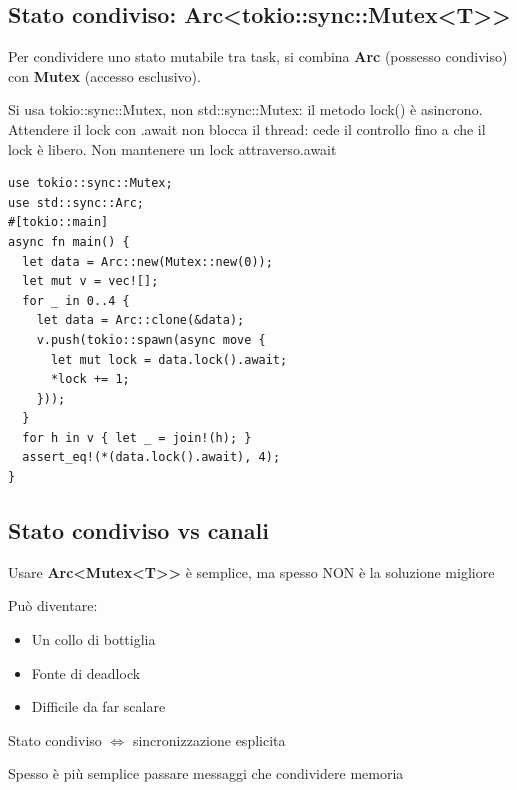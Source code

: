 \subsection{Stato condiviso: Arc<tokio::sync::Mutex<T>>}

\begin{flushleft}
  \begin{minipage}[t]{0.35\linewidth}
    \raggedright

    Per condividere uno stato mutabile tra
    task, si combina \textbf{Arc} (possesso
    condiviso) con \textbf{Mutex} (accesso
    esclusivo).

    Si usa tokio::sync::Mutex, non std::sync::Mutex: il metodo lock() è asincrono.
    Attendere il lock con .await non blocca il thread: cede il controllo fino a che il lock è libero.
    Non mantenere un lock attraverso.await

  \end{minipage}%
  \hfill
  \begin{minipage}[t]{0.6\linewidth}
    \begin{verbatim}
use tokio::sync::Mutex;
use std::sync::Arc;
#[tokio::main]
async fn main() {
  let data = Arc::new(Mutex::new(0));
  let mut v = vec![];
  for _ in 0..4 {
    let data = Arc::clone(&data);
    v.push(tokio::spawn(async move {
      let mut lock = data.lock().await;
      *lock += 1;
    }));
  }
  for h in v { let _ = join!(h); }
  assert_eq!(*(data.lock().await), 4);
}
\end{verbatim}
  \end{minipage}
\end{flushleft}

\subsection{Stato condiviso vs canali}

Usare \textbf{Arc<Mutex<T>>} è semplice, ma spesso NON è la soluzione migliore


Può diventare:

\begin{itemize}
  \item Un collo di bottiglia
  \item Fonte di deadlock
  \item Difficile da far scalare
\end{itemize}

Stato condiviso $\Leftrightarrow$ sincronizzazione esplicita

Spesso è più semplice passare messaggi che condividere memoria

